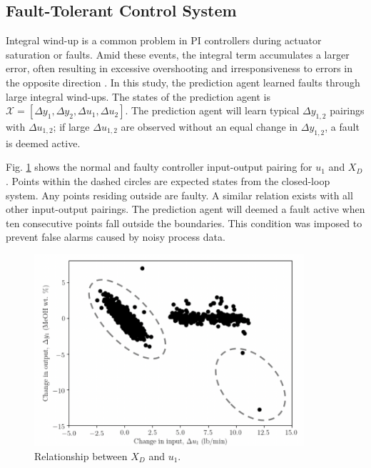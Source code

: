 \subsection{Fault-Tolerant Control System}
Integral wind-up is a common problem in PI controllers during actuator saturation or faults.  Amid these events, the integral term accumulates a larger error, often resulting in excessive overshooting and irresponsiveness to errors in the opposite direction \cite{process_control_ref13}. In this study, the prediction agent learned faults through large integral wind-ups.  The states of the prediction agent is ${\mathcal{X}} = [\Delta y_1, \Delta y_2, \Delta u_1, \Delta u_2]$. The prediction agent will learn typical $\Delta y_{1, 2}$ pairings with $\Delta u_{1, 2}$; if large $\Delta u_{1, 2}$ are observed without an equal change in $\Delta y_{1, 2}$, a fault is deemed active.

Fig. \ref{fig:FDS} shows the normal and faulty controller input-output pairing for $u_1$ and $X_D$. Points within the dashed circles are expected states from the closed-loop system. Any points residing outside are faulty. A similar relation exists with all other input-output pairings. The prediction agent will deemed a fault active when ten consecutive points fall outside the boundaries. This condition was imposed to prevent false alarms caused by noisy process data.
\begin{figure}[h]
    \begin{center}
        \includegraphics[width=10cm]{images/ftc/Boundaries.png}
        \caption{\label{fig:FDS} Relationship between $X_D$ and $u_1$.}
    \end{center}
\end{figure}

